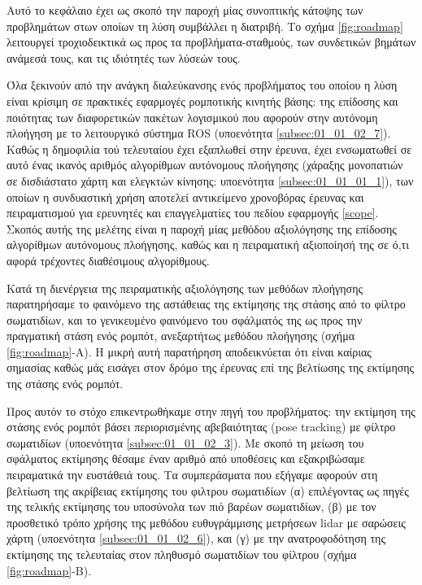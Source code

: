 Αυτό το κεφάλαιο έχει ως σκοπό την παροχή μίας συνοπτικής κάτοψης των
προβλημάτων στων οποίων τη λύση συμβάλλει η διατριβή. Το σχήμα
\ref{fig:roadmap} λειτουργεί τροχιοδεικτικά ως προς τα προβλήματα-σταθμούς,
των συνδετικών βημάτων ανάμεσά τους, και τις ιδιότητές των λύσεών τους.


Όλα ξεκινούν από την ανάγκη διαλεύκανσης ενός προβλήματος του οποίου η λύση
είναι κρίσιμη σε πρακτικές εφαρμογές ρομποτικής κινητής βάσης: της επίδοσης και
ποιότητας των διαφορετικών πακέτων λογισμικού που αφορούν στην αυτόνομη
πλοήγηση με το λειτουργικό σύστημα ROS (υποενότητα \ref{subsec:01_01_02_7}).
Καθώς η δημοφιλία τού τελευταίου έχει εξαπλωθεί στην έρευνα, έχει ενσωματωθεί
σε αυτό ένας ικανός αριθμός αλγορίθμων αυτόνομους πλοήγησης (χάραξης μονοπατιών
σε δισδιάστατο χάρτη και ελεγκτών κίνησης: υποενότητα \ref{subsec:01_01_01_1}),
των οποίων η συνδυαστική χρήση αποτελεί αντικείμενο χρονοβόρας έρευνας και
πειραματισμού για ερευνητές και επαγγελματίες του πεδίου εφαρμογής \ref{scope}.
Σκοπός αυτής της μελέτης είναι η παροχή μίας μεθόδου αξιολόγησης της επίδοσης
αλγορίθμων αυτόνομους πλοήγησης, καθώς και η πειραματική αξιοποίησή της σε ό,τι
αφορά τρέχοντες διαθέσιμους αλγορίθμους.

Κατά τη διενέργεια της πειραματικής αξιολόγησης των μεθόδων πλοήγησης
παρατηρήσαμε το φαινόμενο της αστάθειας της εκτίμησης της στάσης από το φίλτρο
σωματιδίων, και το γενικευμένο φαινόμενο του σφάλματός της ως προς την
πραγματική στάση ενός ρομπότ, ανεξαρτήτως μεθόδου πλοήγησης (σχήμα
\ref{fig:roadmap}-Α). Η μικρή αυτή παρατήρηση αποδεικνύεται ότι είναι καίριας
σημασίας καθώς μάς εισάγει στον δρόμο της έρευνας επί της βελτίωσης της
εκτίμησης της στάσης ενός ρομπότ.


Προς αυτόν το στόχο επικεντρωθήκαμε στην πηγή του προβλήματος: την εκτίμηση της
στάσης ενός ρομπότ βάσει περιορισμένης αβεβαιότητας (pose tracking) με φίλτρο
σωματιδίων (υποενότητα \ref{subsec:01_01_02_3}). Με σκοπό τη μείωση του
σφάλματος εκτίμησης θέσαμε έναν αριθμό από υποθέσεις και εξακριβώσαμε
πειραματικά την ευστάθειά τους. Τα συμπεράσματα που εξήγαμε αφορούν στη
βελτίωση της ακρίβειας εκτίμησης του φιλτρου σωματιδίων (α) επιλέγοντας ως
πηγές της τελικής εκτίμησης του υποσύνολα των πιό βαρέων σωματιδίων, (β) με τον
προσθετικό τρόπο χρήσης της μεθόδου ευθυγράμμισης μετρήσεων lidar με σαρώσεις
χάρτη (υποενότητα \ref{subsec:01_01_02_6}), και (γ) με την ανατροφοδότηση της
εκτίμησης της τελευταίας στον πληθυσμό σωματιδίων του φίλτρου (σχήμα
\ref{fig:roadmap}-Β).

